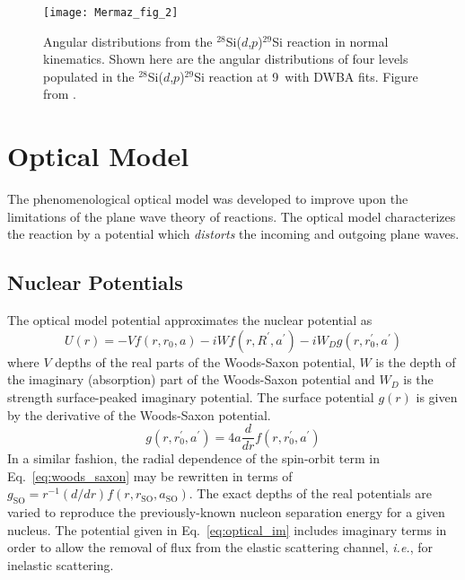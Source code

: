 \begin{figure}%
\centering
\texttt{[image: Mermaz\_fig\_2]}
\caption[Angular distributions from the $^{28}$Si($d$,$p$)$^{29}$Si reaction in normal kinematics]{Angular distributions from the $^{28}$Si($d$,$p$)$^{29}$Si reaction in normal kinematics.  Shown here are the angular distributions of four levels populated in the $^{28}$Si($d$,$p$)$^{29}$Si reaction at 9\,\AMeV{} with DWBA fits.  Figure from \citet[Fig.~1]{Mermaz_1971}.}
\label{si_ang}
\end{figure}

\section{Optical Model}
The phenomenological optical model was developed to improve upon the limitations of the plane wave theory of reactions.  The optical model characterizes the reaction by a potential which \textit{distorts} the incoming and outgoing plane waves.
\subsection{Nuclear Potentials}
The optical model potential approximates the nuclear potential as
\begin{equation}
U(r)=-V f(r,r_0,a)-iW f(r,R^\prime,a^\prime)-iW_D g(r,r_0^\prime,a^\prime)
\label{eq:optical_im}
\end{equation}
where $V$ depths of the real parts of the Woods-Saxon potential, $W$ is the depth of the imaginary (absorption) part of the Woods-Saxon potential and $W_D$ is the strength surface-peaked imaginary potential.  The surface potential $g(r)$ is given by the derivative of the Woods-Saxon potential.
\begin{equation}
g(r,r_0^\prime,a^\prime)=4a\frac{d}{dr}f(r,r_0^\prime,a^\prime)
\label{eq:surface}
\end{equation}
In a similar fashion, the radial dependence of the spin-orbit term in Eq.~\ref{eq:woods_saxon} may be rewritten in terms of $g_\mathrm{SO}=r^{-1}(d/dr)f(r,r_\mathrm{SO},a_\mathrm{SO})$.  The exact depths of the real potentials are varied to reproduce the previously-known nucleon separation energy for a given nucleus.  The potential given in Eq.~\ref{eq:optical_im} includes imaginary terms in order to allow the removal of flux from the elastic scattering channel, \textit{i.e.}, for inelastic scattering.
